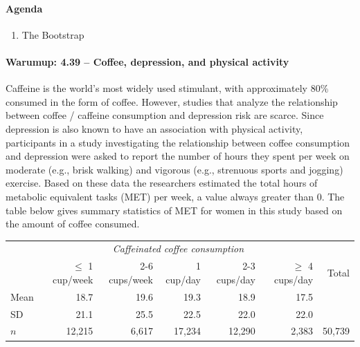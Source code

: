 \documentclass[10pt]{article}\usepackage[]{graphicx}\usepackage[]{color}
\begin{document}
\paragraph{Agenda}
\begin{enumerate}
  \itemsep0em
  \item The Bootstrap
\end{enumerate}


\paragraph{Warumup: 4.39 -- Coffee, depression, and physical activity} Caffeine is the world's most widely used stimulant, with approximately 80\% consumed in the form of coffee. However, studies that analyze the relationship between coffee / caffeine consumption and depression risk are scarce. Since depression is also known to have an association with physical activity, participants in a study investigating the relationship between coffee consumption and depression were asked to report the number of hours they spent per week on moderate (e.g., brisk walking) and vigorous (e.g., strenuous sports and jogging) exercise. Based on these data the researchers estimated the total hours of metabolic equivalent tasks (MET) per week, a value always greater than 0. The table below gives summary statistics of MET for women in this study based on the amount of coffee consumed. 
 
\begin{center}
\begin{tabular}{l  r  r  r  r  r  r}
\multicolumn{1}{c}{}  & \multicolumn{5}{c}{\textit{Caffeinated coffee consumption}} \\
\cline{2-6}
				& $\le$ 1 cup/week	& 2-6 cups/week	& 1 cup/day	& 2-3 cups/day & $\ge$ 4 cups/day & Total	\\
\hline
Mean			& 18.7	& 19.6	& 19.3	& 18.9	& 17.5 			  \\
SD				& 21.1	& 25.5	& 22.5	& 22.0	& 22.0 \\
$n$				& 12,215	& 6,617 		& 17,234	& 12,290	& 2,383 	& 50,739 \\
\hline
\end{tabular}
\end{center}
\end{document}
